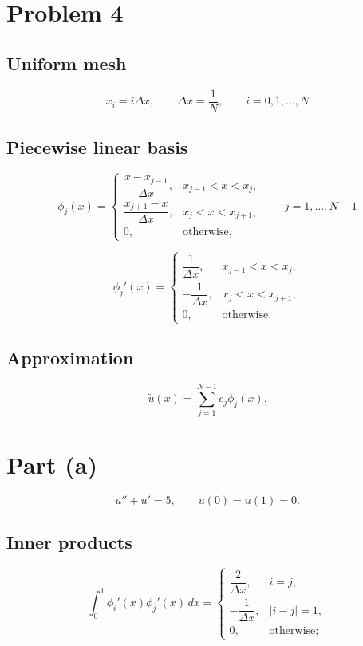 \documentclass{article}
\begin{document}
\newpage

\section*{Problem 4}

\subsection*{Uniform mesh}

\[
x_i=i\Delta x,\qquad \Delta x=\dfrac1N,\qquad i=0,1,\dots ,N
\]

\subsection*{Piecewise linear basis}

\[
\phi_j(x)=
\begin{cases}
\dfrac{x-x_{j-1}}{\Delta x}, & x_{j-1}<x<x_j,\\[4pt]
\dfrac{x_{j+1}-x}{\Delta x}, & x_j<x<x_{j+1},\\[4pt]
0, & \text{otherwise},
\end{cases}
\qquad j=1,\dots ,N-1
\]

\[
\phi_j'(x)=
\begin{cases}
\dfrac1{\Delta x}, & x_{j-1}<x<x_j,\\[6pt]
-\dfrac1{\Delta x}, & x_j<x<x_{j+1},\\[6pt]
0, & \text{otherwise}.
\end{cases}
\]

\subsection*{Approximation}

\[
\tilde u(x)=\sum_{j=1}^{N-1}c_j\phi_j(x).
\]

\bigskip
\section*{Part (a)}

\[
u''+u'=5,\qquad u(0)=u(1)=0.
\]

\subsection*{Inner products}

\vspace{-2ex}
\[
\int_0^1\phi_i'(x)\phi_j'(x)\,dx=
\begin{cases}
\dfrac{2}{\Delta x}, & i=j,\\[6pt]
-\dfrac{1}{\Delta x}, & |i-j|=1,\\[6pt]
0, & \text{otherwise};
\end{cases}
\]
\end{document}
